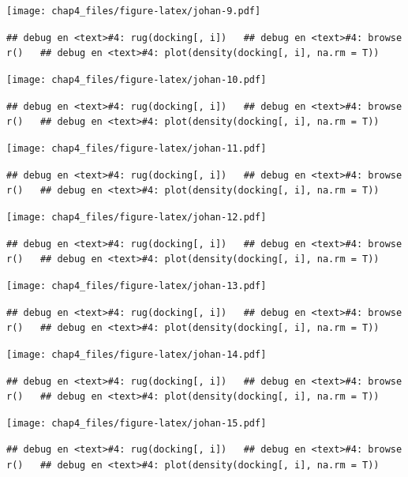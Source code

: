 \documentclass[]{article}
\begin{document}
{\texttt{[image: chap4\_files/figure-latex/johan-9.pdf]}

\texttt{\#\#\ debug\ en\ \textless{}text\textgreater{}\#4:\ rug(docking{[},\ i{]})\ \ \ \#\#\ debug\ en\ \textless{}text\textgreater{}\#4:\ browser()\ \ \ \#\#\ debug\ en\ \textless{}text\textgreater{}\#4:\ plot(density(docking{[},\ i{]},\ na.rm\ =\ T))}

\texttt{[image: chap4\_files/figure-latex/johan-10.pdf]}

\texttt{\#\#\ debug\ en\ \textless{}text\textgreater{}\#4:\ rug(docking{[},\ i{]})\ \ \ \#\#\ debug\ en\ \textless{}text\textgreater{}\#4:\ browser()\ \ \ \#\#\ debug\ en\ \textless{}text\textgreater{}\#4:\ plot(density(docking{[},\ i{]},\ na.rm\ =\ T))}

\texttt{[image: chap4\_files/figure-latex/johan-11.pdf]}

\texttt{\#\#\ debug\ en\ \textless{}text\textgreater{}\#4:\ rug(docking{[},\ i{]})\ \ \ \#\#\ debug\ en\ \textless{}text\textgreater{}\#4:\ browser()\ \ \ \#\#\ debug\ en\ \textless{}text\textgreater{}\#4:\ plot(density(docking{[},\ i{]},\ na.rm\ =\ T))}

\texttt{[image: chap4\_files/figure-latex/johan-12.pdf]}

\texttt{\#\#\ debug\ en\ \textless{}text\textgreater{}\#4:\ rug(docking{[},\ i{]})\ \ \ \#\#\ debug\ en\ \textless{}text\textgreater{}\#4:\ browser()\ \ \ \#\#\ debug\ en\ \textless{}text\textgreater{}\#4:\ plot(density(docking{[},\ i{]},\ na.rm\ =\ T))}

\texttt{[image: chap4\_files/figure-latex/johan-13.pdf]}

\texttt{\#\#\ debug\ en\ \textless{}text\textgreater{}\#4:\ rug(docking{[},\ i{]})\ \ \ \#\#\ debug\ en\ \textless{}text\textgreater{}\#4:\ browser()\ \ \ \#\#\ debug\ en\ \textless{}text\textgreater{}\#4:\ plot(density(docking{[},\ i{]},\ na.rm\ =\ T))}

\texttt{[image: chap4\_files/figure-latex/johan-14.pdf]}

\texttt{\#\#\ debug\ en\ \textless{}text\textgreater{}\#4:\ rug(docking{[},\ i{]})\ \ \ \#\#\ debug\ en\ \textless{}text\textgreater{}\#4:\ browser()\ \ \ \#\#\ debug\ en\ \textless{}text\textgreater{}\#4:\ plot(density(docking{[},\ i{]},\ na.rm\ =\ T))}

\texttt{[image: chap4\_files/figure-latex/johan-15.pdf]}

\texttt{\#\#\ debug\ en\ \textless{}text\textgreater{}\#4:\ rug(docking{[},\ i{]})\ \ \ \#\#\ debug\ en\ \textless{}text\textgreater{}\#4:\ browser()\ \ \ \#\#\ debug\ en\ \textless{}text\textgreater{}\#4:\ plot(density(docking{[},\ i{]},\ na.rm\ =\ T))}

}
\end{document}
